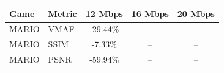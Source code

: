 \begin{tabular}{llccc}
\toprule
Game & Metric & 12 Mbps & 16 Mbps & 20 Mbps \\
\midrule
MARIO & VMAF & -29.44\% & -- & -- \\
MARIO & SSIM & -7.33\% & -- & -- \\
MARIO & PSNR & -59.94\% & -- & -- \\
\bottomrule
\end{tabular}
